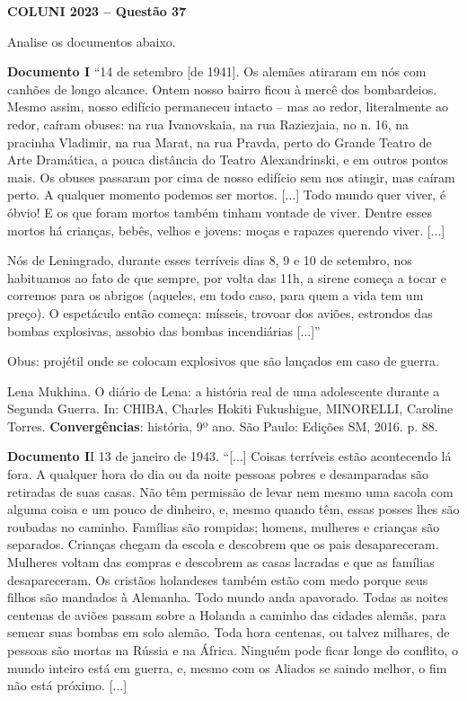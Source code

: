 \textbf{COLUNI 2023 -- Questão 37}\par\medskip Analise os documentos abaixo.

\par

\textbf{Documento I} “14 de setembro [de 1941]. Os alemães atiraram em nós com canhões de longo alcance. Ontem nosso bairro ficou à mercê dos bombardeios. Mesmo assim, nosso edifício permaneceu intacto – mas ao redor, literalmente ao redor, caíram obuses: na rua Ivanovskaia, na rua Raziezjaia, no n. 16, na pracinha Vladimir, na rua Marat, na rua Pravda, perto do Grande Teatro de Arte Dramática, a pouca distância do Teatro Alexandrinski, e em outros pontos mais. Os obuses passaram por cima de nosso edifício sem nos atingir, mas caíram perto. A qualquer momento podemos ser mortos. [...] Todo mundo quer viver, é óbvio! E os que foram mortos também tinham vontade de viver. Dentre esses mortos há crianças, bebês, velhos e jovens: moças e rapazes querendo viver. [...]

\par

Nós de Leningrado, durante esses terríveis dias 8, 9 e 10 de setembro, nos habituamos ao fato de que sempre, por volta das 11h, a sirene começa a tocar e corremos para os abrigos (aqueles, em todo caso, para quem a vida tem um preço). O espetáculo então começa: mísseis, trovoar dos aviões, estrondos das bombas explosivas, assobio das bombas incendiárias [...]”

\par

Obus: projétil onde se colocam explosivos que são lançados em caso de guerra.

\par

Lena Mukhina. O diário de Lena: a história real de uma adolescente durante a Segunda Guerra. In: CHIBA, Charles Hokiti Fukushigue, MINORELLI, Caroline Torres. \textbf{Convergências}: história, 9º ano. São Paulo: Edições SM, 2016. p. 88.

\par

\textbf{Documento I}I 13 de janeiro de 1943. “[...] Coisas terríveis estão acontecendo lá fora. A qualquer hora do dia ou da noite pessoas pobres e desamparadas são retiradas de suas casas. Não têm permissão de levar nem mesmo uma sacola com alguma coisa e um pouco de dinheiro, e, mesmo quando têm, essas posses lhes são roubadas no caminho. Famílias são rompidas; homens, mulheres e crianças são separados. Crianças chegam da escola e descobrem que os pais desapareceram. Mulheres voltam das compras e descobrem as casas lacradas e que as famílias desapareceram. Os cristãos holandeses também estão com medo porque seus filhos são mandados à Alemanha. Todo mundo anda apavorado. Todas as noites centenas de aviões passam sobre a Holanda a caminho das cidades alemãs, para semear suas bombas em solo alemão. Toda hora centenas, ou talvez milhares, de pessoas são mortas na Rússia e na África. Ninguém pode ficar longe do conflito, o mundo inteiro está em guerra, e, mesmo com os Aliados se saindo melhor, o fim não está próximo. [...]

